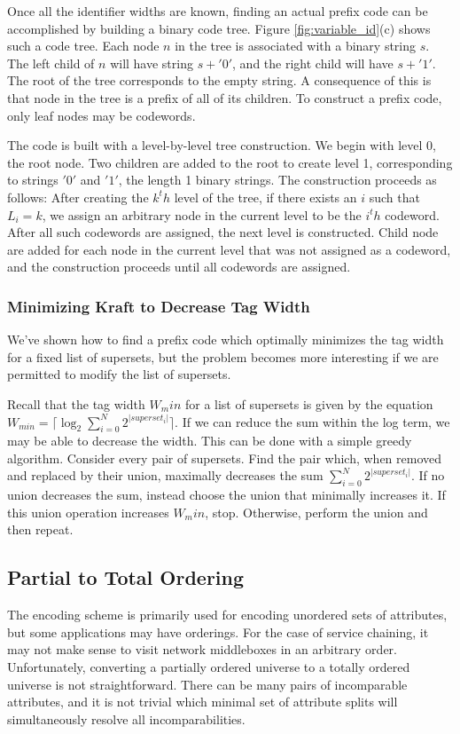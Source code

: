  Once all the identifier widths are known, finding an actual prefix code can be accomplished by building a binary code tree. Figure \ref{fig:variable_id}(c) shows such a code tree. Each node $n$ in the tree is associated with a binary string $s$. The left child of $n$ will have string $s + '0'$, and the right child will have $s + '1'$. The root of the tree corresponds to the empty string. A consequence of this is that node in the tree is a prefix of all of its children. To construct a prefix code, only leaf nodes may be codewords. 
 
 The code is built with a level-by-level tree construction. We begin with level 0, the root node. Two children are added to the root to create level 1, corresponding to strings $'0'$ and $'1'$, the length 1 binary strings. The construction proceeds as follows:  After creating the $k^th$ level of the tree, if there exists an $i$ such that $L_i = k$, we assign an arbitrary node in the current level to be the $i^th$ codeword. After all such codewords are assigned, the next level is constructed. Child node are added for each node in the current level that was not assigned as a codeword, and the construction proceeds until all codewords are assigned.
 
\subsubsection{Minimizing Kraft to Decrease Tag Width}
We've shown how to find a prefix code which optimally minimizes the tag width for a fixed list of supersets, but the problem becomes more interesting if we are permitted to modify the list of supersets. 

Recall that the tag width $W_min$ for a list of supersets is given by the equation $W_{min} = \lceil\log_2{\sum_{i = 0}^{N}{2^{|superset_i|}}}\rceil$. If we can reduce the sum within the log term, we may be able to decrease the width. This can be done with a simple greedy algorithm. Consider every pair of supersets. Find the pair which, when removed and replaced by their union, maximally decreases the sum ${\sum_{i = 0}^{N}{2^{|superset_i|}}}$. If no union decreases the sum, instead choose the union that minimally increases it. If this union operation increases $W_min$, stop. Otherwise, perform the union and then repeat. 

\subsection{Partial to Total Ordering}
The encoding scheme is primarily used for encoding unordered sets of attributes, but some applications may have orderings. For the case of service chaining, it may not make sense to visit network middleboxes in an arbitrary order. 
Unfortunately, converting a partially ordered universe to a totally ordered universe is not straightforward. There can be many pairs of incomparable attributes, and it is not trivial which minimal set of attribute splits will simultaneously resolve all incomparabilities. 


